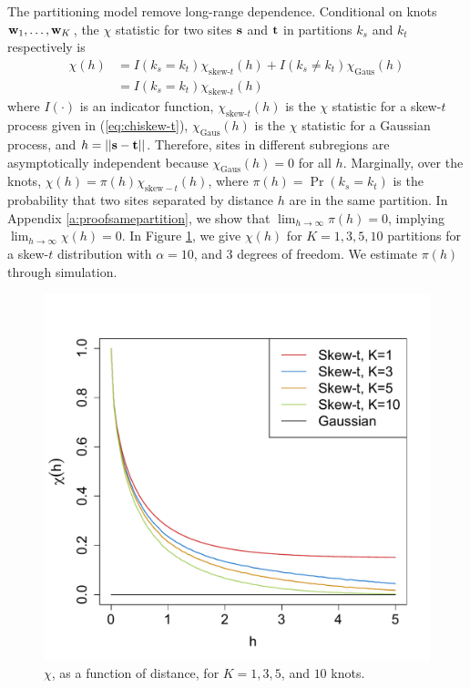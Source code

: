 \documentclass[11pt]{article}
\begin{document}
The partitioning model remove long-range dependence. Conditional on knots $\mbox{\bf w}_1, \ldots, \mbox{\bf w}_K$, the $\chi$ statistic for two sites $\mbox{\bf s}$ and $\mbox{\bf t}$ in partitions $k_s$ and $k_t$ respectively is
\begin{align}
  \chi(h) &= I(k_s = k_t) \chi_{\text{skew-}t}(h) + I(k_s \neq k_t) \chi_{\text{Gaus}}(h) \nonumber \\
         &= I(k_s = k_t) \chi_{\text{skew-}t}(h)
\end{align}
where $I(\cdot)$ is an indicator function, $\chi_{\text{skew-}t}(h)$ is the $\chi$ statistic for a skew-$t$ process given in (\ref{eq:chiskew-t}), $\chi_{\text{Gaus}}(h)$ is the $\chi$ statistic for a Gaussian process, and $h = ||\mbox{\bf s} - \mbox{\bf t}||$.
Therefore, sites in different subregions are asymptotically independent because $\chi_{\text{Gaus}}(h) = 0$ for all $h$.
Marginally, over the knots, $\chi(h) = \pi(h) \chi_{\text{skew}-t}(h)$, where $\pi(h) = \Pr(k_s = k_t)$ is the probability that two sites separated by distance $h$ are in the same partition.
In Appendix \ref{a:proofsamepartition}, we show that $\lim_{h \rightarrow \infty} \pi(h) = 0$, implying $\lim_{h \rightarrow \infty} \chi(h) = 0$.
In Figure \ref{fig:chi}, we give $\chi(h)$ for $K = 1, 3, 5, 10$ partitions for a skew-$t$ distribution with $\alpha = 10$, and 3 degrees of freedom.
We estimate $\pi(h)$ through simulation.

\begin{figure}
  \centering
  \includegraphics[width=0.5\linewidth]{plots/chi-h.pdf}
  \caption{$\chi$, as a function of distance, for $K = 1, 3, 5$, and $10$ knots.}
  \label{fig:chi}
\end{figure}
\end{document}
